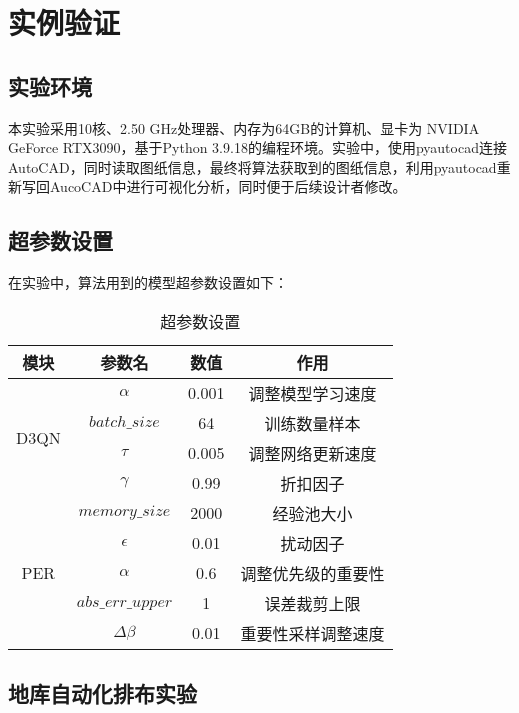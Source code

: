 \section{实例验证}
\subsection{实验环境}
本实验采用10核、2.50 GHz处理器、内存为64GB的计算机、显卡为 NVIDIA GeForce RTX3090，基于Python 3.9.18的编程环境。实验中，使用pyautocad连接AutoCAD，同时读取图纸信息，最终将算法获取到的图纸信息，利用pyautocad重新写回AucoCAD中进行可视化分析，同时便于后续设计者修改。
\subsection{超参数设置}
在实验中，算法用到的模型超参数设置如下：
\begin{table}[!htb]
    \caption{\label{tab:hyper_para}超参数设置}
    \centering
    \linespread{1.25}\selectfont
    \begin{tabular}{cccc}
        \hline
        模块                    & 参数名               & 数值    & 作用   \\
        \hline
        \multirow{4}{*}{D3QN} & $\alpha$          & 0.001 & 调整模型学习速度 \\
                              & $batch\_size$     & 64    & 训练数量样本 \\
                              & $\tau$            & 0.005 & 调整网络更新速度 \\
                              & $\gamma$          & 0.99  & 折扣因子 \\
        \hline
        \multirow{5}{*}{PER}  & $memory\_size$    & 2000  & 经验池大小 \\
                              & $\epsilon$        & 0.01  & 扰动因子 \\
                              & $\alpha$          & 0.6   & 调整优先级的重要性 \\
                              & $abs\_err\_upper$ & 1     & 误差裁剪上限 \\
                              & $\Delta \beta$    & 0.01  & 重要性采样调整速度 \\
        \hline
    \end{tabular}
\end{table}

\subsection{地库自动化排布实验}
